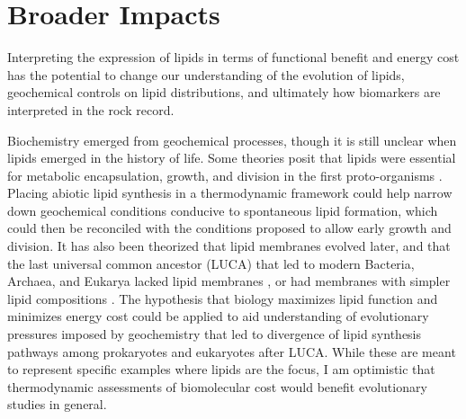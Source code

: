 
\section{Broader Impacts}

Interpreting the expression of lipids in terms of functional benefit and energy cost has the potential to change our understanding of the evolution of lipids, geochemical controls on lipid distributions, and ultimately how biomarkers are interpreted in the rock record.

Biochemistry emerged from geochemical processes, though it is still unclear when lipids emerged in the history of life. Some theories posit that lipids were essential for metabolic encapsulation, growth, and division in the first proto-organisms \citep{deamer2002first, luisi2016emergence}. Placing abiotic lipid synthesis in a thermodynamic framework could help narrow down geochemical conditions conducive to spontaneous lipid formation, which could then be reconciled with the conditions proposed to allow early growth and division. It has also been theorized that lipid membranes evolved later, and that the last universal common ancestor (LUCA) that led to modern Bacteria, Archaea, and Eukarya lacked lipid membranes \citep{koga1998did, martin2003origins}, or had membranes with simpler lipid compositions \citep{sojo2014bioenergetic}. The hypothesis that biology maximizes lipid function and minimizes energy cost could be applied to aid understanding of evolutionary pressures imposed by geochemistry that led to divergence of lipid synthesis pathways among prokaryotes and eukaryotes after LUCA. While these are meant to represent specific examples where lipids are the focus, I am optimistic that thermodynamic assessments of biomolecular cost would benefit evolutionary studies in general.







